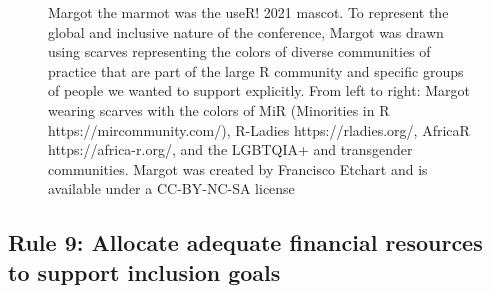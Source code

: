 \documentclass[10pt,letterpaper]{article}
\begin{document}
\begin{figure}[!h]
\centering
{}
\caption{Margot the marmot was the useR! 2021 mascot. To represent the global and inclusive nature of the conference, Margot was drawn using scarves representing the colors of diverse communities of practice that are part of the large R community and specific groups of people we wanted to support explicitly. From left to right: Margot wearing scarves with the colors of MiR (Minorities in R https://mircommunity.com/), R-Ladies https://rladies.org/, AfricaR https://africa-r.org/, and the LGBTQIA+ and transgender communities. Margot was created by Francisco Etchart and is available under a CC-BY-NC-SA license} 
\label{fig:marmots}
\end{figure}

\subsection*{Rule 9: Allocate adequate financial resources to support inclusion goals}
\label{rule_financial}
\end{document}
